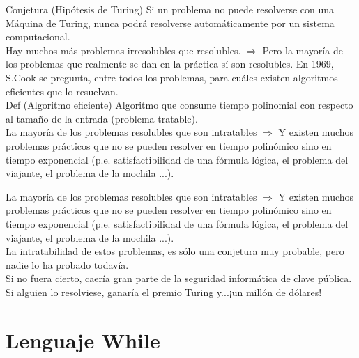 \documentclass[xcolor=table]{beamer}
\begin{document}
\begin{frame}  \small  

Conjetura (Hipótesis de Turing)   Si un problema no puede resolverse con una Máquina de Turing, nunca podrá resolverse automáticamente por un sistema computacional.\\

Hay muchos más problemas irresolubles que resolubles. $ \Rightarrow$ Pero la mayoría de los problemas que realmente se dan en la práctica sí son resolubles.
En 1969, S.Cook se pregunta, entre todos los problemas, para cuáles existen algoritmos eficientes que lo resuelvan.\\

Def (Algoritmo eficiente)   Algoritmo que consume tiempo polinomial con respecto al tamaño de la entrada (problema tratable).\\

La mayoría de los problemas resolubles que son intratables $ \Rightarrow$ Y existen muchos problemas prácticos que no se pueden resolver en tiempo polinómico sino en tiempo exponencial (p.e. satisfactibilidad de una fórmula lógica, el problema del viajante, el problema de la mochila ...).




\end{frame} 

\begin{frame}  \small  


La mayoría de los problemas resolubles que son intratables $ \Rightarrow$ Y existen muchos problemas prácticos que no se pueden resolver en tiempo polinómico sino en tiempo exponencial (p.e. satisfactibilidad de una fórmula lógica, el problema del viajante, el problema de la mochila ...).\\


La intratabilidad de estos problemas, es sólo una conjetura muy probable, pero nadie lo ha probado todavía.\\

Si no fuera cierto, caería gran parte de la seguridad informática de clave pública.
Si alguien lo resolviese, ganaría el premio Turing y...¡un millón de dólares!
\end{frame} 

\section{Lenguaje While}
\end{document}
